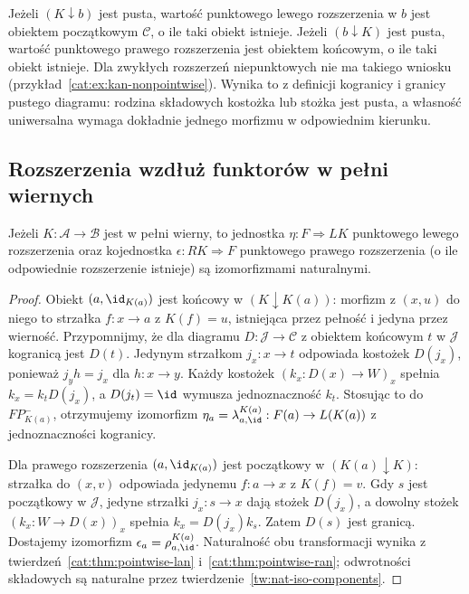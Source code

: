 \begin{przyklad}\label{cat:ex:kan-empty}
Jeżeli $(K\downarrow b)$ jest pusta, wartość punktowego lewego rozszerzenia w $b$ jest obiektem początkowym $\mathcal C$, o ile taki obiekt istnieje. Jeżeli $(b\downarrow K)$ jest pusta, wartość punktowego prawego rozszerzenia jest obiektem końcowym, o ile taki obiekt istnieje. Dla zwykłych rozszerzeń niepunktowych nie ma takiego wniosku (przykład~\ref{cat:ex:kan-nonpointwise}). Wynika to z definicji kogranicy i granicy pustego diagramu: rodzina składowych kostożka lub stożka jest pusta, a własność uniwersalna wymaga dokładnie jednego morfizmu w odpowiednim kierunku.
\end{przyklad}

\subsection{Rozszerzenia wzdłuż funktorów w pełni wiernych}
\begin{twierdzenie}\label{cat:thm:kan-fully-faithful}
Jeżeli $K:\mathcal A\to\mathcal B$ jest w pełni wierny, to jednostka $\eta:F\Rightarrow LK$ punktowego lewego rozszerzenia oraz kojednostka $\epsilon:RK\Rightarrow F$ punktowego prawego rozszerzenia (o ile odpowiednie rozszerzenie istnieje) są izomorfizmami naturalnymi.
\end{twierdzenie}
\begin{proof}
Obiekt $(a,\id_{K(a)})$ jest końcowy w $(K\downarrow K(a))$: morfizm z $(x,u)$ do niego to strzałka $f:x\to a$ z $K(f)=u$, istniejąca przez pełność i jedyna przez wierność. Przypomnijmy, że dla diagramu $D:\mathcal J\to\mathcal C$ z obiektem końcowym $t$ w $\mathcal J$ kogranicą jest $D(t)$. Jedynym strzałkom $j_x:x\to t$ odpowiada kostożek $D(j_x)$, ponieważ $j_yh=j_x$ dla $h:x\to y$. Każdy kostożek $(k_x:D(x)\to W)_x$ spełnia $k_x=k_tD(j_x)$, a $D(j_t)=\id$ wymusza jednoznaczność $k_t$. Stosując to do $FP^-_{K(a)}$, otrzymujemy izomorfizm $\eta_a=\lambda^{K(a)}_{a,\id}:F(a)\to L(K(a))$ z jednoznaczności kogranicy.

Dla prawego rozszerzenia $(a,\id_{K(a)})$ jest początkowy w $(K(a)\downarrow K)$: strzałka do $(x,v)$ odpowiada jedynemu $f:a\to x$ z $K(f)=v$. Gdy $s$ jest początkowy w $\mathcal J$, jedyne strzałki $j_x:s\to x$ dają stożek $D(j_x)$, a dowolny stożek $(k_x:W\to D(x))_x$ spełnia $k_x=D(j_x)k_s$. Zatem $D(s)$ jest granicą. Dostajemy izomorfizm $\epsilon_a=\rho^{K(a)}_{a,\id}$. Naturalność obu transformacji wynika z twierdzeń~\ref{cat:thm:pointwise-lan} i~\ref{cat:thm:pointwise-ran}; odwrotności składowych są naturalne przez twierdzenie~\ref{tw:nat-iso-components}.
\end{proof}
